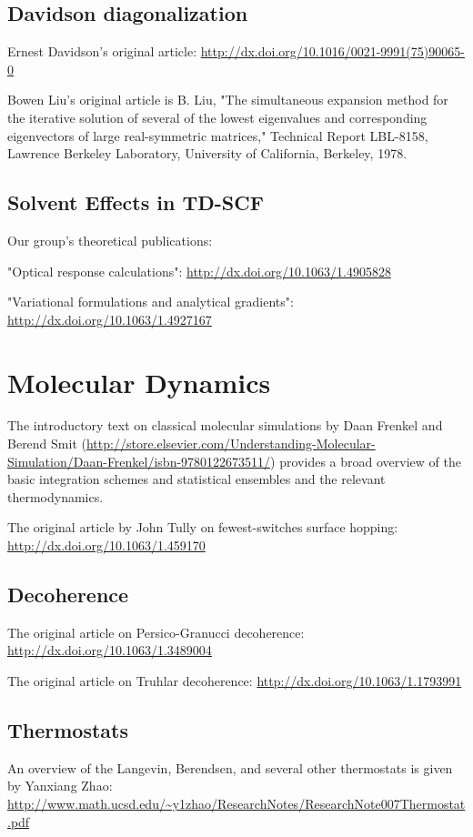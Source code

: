\documentclass[12pt,letter,footinclude=true,headinclude=true,hyphens,oneside]{book} %
\begin{document}
    \subsection{Davidson diagonalization}
    
    Ernest Davidson's original article: \url{http://dx.doi.org/10.1016/0021-9991(75)90065-0}
    
    
    \noindent Bowen Liu's original article is
    B. Liu, "The simultaneous expansion method for the iterative solution of several of the lowest eigenvalues and corresponding eigenvectors of large real-symmetric matrices," Technical Report LBL-8158, Lawrence Berkeley Laboratory, University of California, Berkeley, 1978.
    
    \subsection{Solvent Effects in TD-SCF}
    
    Our group's theoretical publications:
    
    
    "Optical response calculations": \url{http://dx.doi.org/10.1063/1.4905828}
    
    
    "Variational formulations and analytical gradients": \url{http://dx.doi.org/10.1063/1.4927167}
    
    \section{Molecular Dynamics}
    
    The introductory text on classical molecular simulations by Daan Frenkel and Berend Smit (\url{http://store.elsevier.com/Understanding-Molecular-Simulation/Daan-Frenkel/isbn-9780122673511/}) provides a broad overview of the basic integration schemes and statistical ensembles and the relevant thermodynamics.
    
    \noindent The original article by John Tully on fewest-switches surface hopping: \url{http://dx.doi.org/10.1063/1.459170}
    
    \subsection{Decoherence}
    
    The original article on Persico-Granucci decoherence: \url{http://dx.doi.org/10.1063/1.3489004}
    
    \noindent The original article on Truhlar decoherence: \url{http://dx.doi.org/10.1063/1.1793991}
    
    \subsection{Thermostats}
    
    An overview of the Langevin, Berendsen, and several other thermostats is given by Yanxiang Zhao: \url{http://www.math.ucsd.edu/~y1zhao/ResearchNotes/ResearchNote007Thermostat.pdf}
\end{document}

